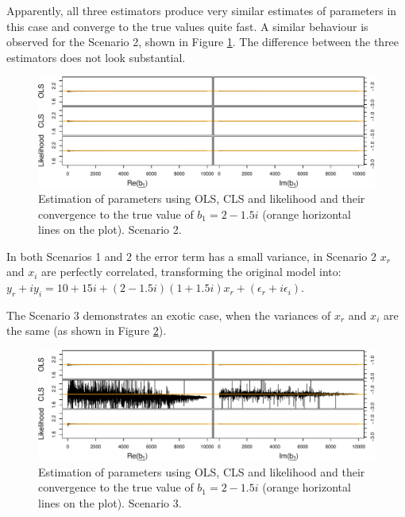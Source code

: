 \documentclass[
]{book}
\begin{document}
Apparently, all three estimators produce very similar estimates of parameters in this case and converge to the true values quite fast. A similar behaviour is observed for the Scenario 2, shown in Figure \ref{fig:parametersPC}. The difference between the three estimators does not look substantial.

\begin{figure}
\centering
\includegraphics{Svetunkov---Svetunkov---Complex-Dynamic-Models_files/figure-latex/parametersPC-1.pdf}
\caption{\label{fig:parametersPC}Estimation of parameters using OLS, CLS and likelihood and their convergence to the true value of \(b_1=2-1.5i\) (orange horizontal lines on the plot). Scenario 2.}
\end{figure}

In both Scenarios 1 and 2 the error term has a small variance, in Scenario 2 \(x_r\) and \(x_i\) are perfectly correlated, transforming the original model into: \(y_r + i y_i = 10+15i + (2-1.5i) (1 + 1.5 i) x_r + (\epsilon_r + i \epsilon_i)\).

The Scenario 3 demonstrates an exotic case, when the variances of \(x_r\) and \(x_i\) are the same (as shown in Figure \ref{fig:parametersUCSV}).

\begin{figure}
\centering
\includegraphics{Svetunkov---Svetunkov---Complex-Dynamic-Models_files/figure-latex/parametersUCSV-1.pdf}
\caption{\label{fig:parametersUCSV}Estimation of parameters using OLS, CLS and likelihood and their convergence to the true value of \(b_1=2-1.5i\) (orange horizontal lines on the plot). Scenario 3.}
\end{figure}
\end{document}
